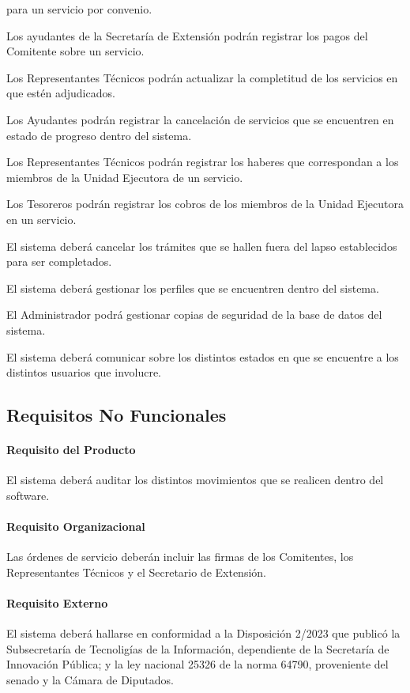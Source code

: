 \begin{enumerate}
{	para un servicio por convenio.}
	\hypertarget{RF-14}{%
	\item Los ayudantes de la Secretar\'ia de
	Extensi\'on podr\'an registrar los pagos del
	Comitente sobre un servicio.}
	\hypertarget{RF-15}{%
	\item Los Representantes T\'ecnicos podr\'an
	actualizar la completitud de los servicios
	en que est\'en adjudicados.}
	\hypertarget{RF-16}{%
	\item Los Ayudantes podr\'an registrar
	la cancelaci\'on de servicios que se 
	encuentren en estado de progreso dentro
	del sistema.}
	\hypertarget{RF-17}{%
	\item Los Representantes T\'ecnicos podr\'an
	registrar los haberes que correspondan a
	los miembros de la Unidad Ejecutora de un
	servicio.}
	\hypertarget{RF-18}{%
	\item Los Tesoreros podr\'an registrar los
	cobros de los miembros de la Unidad Ejecutora
	en un servicio.}
	\hypertarget{RF-19}{%
	\item El sistema deber\'a cancelar los
	tr\'amites que se hallen fuera del lapso
	establecidos para ser completados.}
	\hypertarget{RF-20}{%
	\item El sistema deber\'a gestionar
	los perfiles que se encuentren dentro del
	sistema.}
	\hypertarget{RF-21}{%
	\item El Administrador podr\'a gestionar
	copias de seguridad de la base de datos
	del sistema.}
	\hypertarget{RF-22}{%
	\item El sistema deber\'a comunicar sobre los
	distintos estados en que se encuentre a los
	distintos usuarios que involucre.}
\end{enumerate}
\subsection[No Funcionales]
	{Requisitos No Funcionales}
\paragraph{Requisito del Producto}
El sistema deber\'a auditar los distintos
movimientos que se realicen dentro del software.
\paragraph{Requisito Organizacional}
Las \'ordenes de servicio deber\'an incluir las
firmas de los Comitentes, los Representantes
T\'ecnicos y el Secretario de Extensi\'on.
\paragraph{Requisito Externo}
El sistema deber\'a hallarse en conformidad a
la Disposici\'on 2/2023 que public\'o la
Subsecretar\'ia de Tecnolig\'ias de la
Informaci\'on, dependiente de la Secretar\'ia de
Innovaci\'on P\'ublica; y la ley nacional 25326
de la norma 64790, proveniente del senado y la
C\'amara de Diputados.
